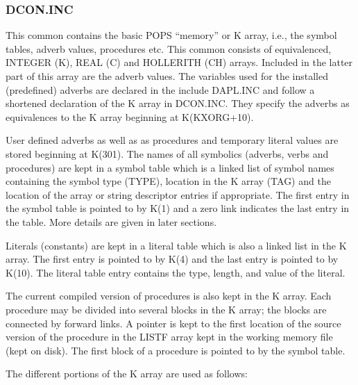 \subsubsection{DCON.INC}
This common contains the basic POPS ``memory'' or K array, i.e., the
symbol tables, adverb values, procedures etc.  This common consists of
equivalenced, INTEGER (K), REAL (C) and HOLLERITH (CH) arrays.
Included in the latter part of this array are the adverb values.  The
variables used for the installed (predefined) adverbs are declared in
the include DAPL.INC and follow a shortened declaration of the K array
in DCON.INC.  They specify the adverbs as equivalences to the K array
beginning at K(KXORG+10).

User defined adverbs as well as as procedures and temporary literal
values are stored beginning at K(301).  The names of all symbolics
(adverbs, verbs and procedures) are kept in a symbol table which is a
linked list of symbol names containing the symbol type (TYPE),
location in the K array (TAG) and the location of the array or string
descriptor entries if appropriate. The first entry in the symbol table
is pointed to by K(1) and a zero link indicates the last entry in the
table.  More details are given in later sections.

Literals (constants) are kept in a literal table which is also a
linked list in the K array. The first entry is pointed to by K(4) and
the last entry is pointed to by K(10).  The literal table entry
contains the type, length, and value of the literal.

The current compiled version of procedures is also kept in the K
array.  Each procedure may be divided into several blocks in the K
array; the blocks are connected by forward links.  A pointer is kept
to the first location of the source version of the procedure in the
LISTF array kept in the working memory file (kept on disk).  The first
block of a procedure is pointed to by the symbol table.

The different portions of the K array are used as follows:

